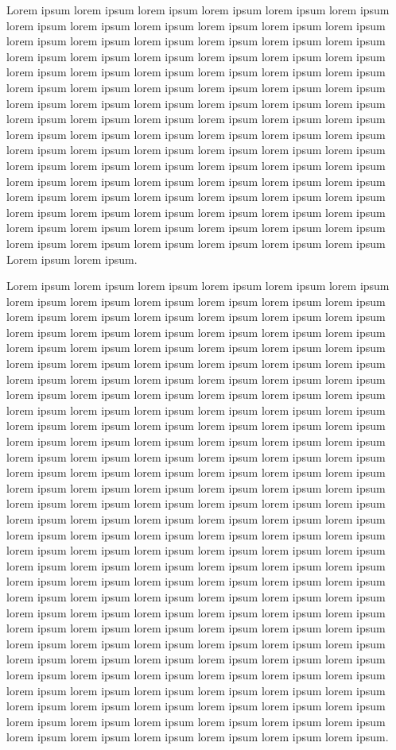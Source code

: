 \documentclass[10pt,twocolumn]{article}
\begin{document}
Lorem ipsum lorem ipsum lorem ipsum lorem ipsum lorem ipsum lorem ipsum lorem
ipsum lorem ipsum lorem ipsum lorem ipsum lorem ipsum lorem ipsum lorem ipsum
lorem ipsum lorem ipsum lorem ipsum lorem ipsum lorem ipsum lorem ipsum lorem
ipsum lorem ipsum lorem ipsum lorem ipsum lorem ipsum lorem ipsum lorem ipsum
lorem ipsum lorem ipsum lorem ipsum lorem ipsum lorem ipsum lorem ipsum lorem
ipsum lorem ipsum lorem ipsum lorem ipsum lorem ipsum lorem ipsum lorem ipsum
lorem ipsum lorem ipsum lorem ipsum lorem ipsum lorem ipsum lorem ipsum lorem
ipsum lorem ipsum lorem ipsum lorem ipsum lorem ipsum lorem ipsum lorem ipsum
lorem ipsum lorem ipsum lorem ipsum lorem ipsum lorem ipsum lorem ipsum lorem
ipsum lorem ipsum lorem ipsum lorem ipsum lorem ipsum lorem ipsum lorem ipsum
lorem ipsum lorem ipsum lorem ipsum lorem ipsum lorem ipsum lorem ipsum lorem
ipsum lorem ipsum lorem ipsum lorem ipsum lorem ipsum lorem ipsum lorem ipsum
lorem ipsum lorem ipsum lorem ipsum lorem ipsum lorem ipsum lorem ipsum lorem
ipsum lorem ipsum lorem ipsum lorem ipsum lorem ipsum lorem ipsum lorem ipsum
lorem ipsum lorem ipsum lorem ipsum lorem ipsum lorem ipsum Lorem ipsum lorem
ipsum.

Lorem ipsum lorem ipsum lorem ipsum lorem ipsum lorem ipsum lorem ipsum lorem
ipsum lorem ipsum lorem ipsum lorem ipsum lorem ipsum lorem ipsum lorem ipsum
lorem ipsum lorem ipsum lorem ipsum lorem ipsum lorem ipsum lorem ipsum lorem
ipsum lorem ipsum lorem ipsum lorem ipsum lorem ipsum lorem ipsum lorem ipsum
lorem ipsum lorem ipsum lorem ipsum lorem ipsum lorem ipsum lorem ipsum lorem
ipsum lorem ipsum lorem ipsum lorem ipsum lorem ipsum lorem ipsum lorem ipsum
lorem ipsum lorem ipsum lorem ipsum lorem ipsum lorem ipsum lorem ipsum lorem
ipsum lorem ipsum lorem ipsum lorem ipsum lorem ipsum lorem ipsum lorem ipsum
lorem ipsum lorem ipsum lorem ipsum lorem ipsum lorem ipsum lorem ipsum lorem
ipsum lorem ipsum lorem ipsum lorem ipsum lorem ipsum lorem ipsum lorem ipsum
lorem ipsum lorem ipsum lorem ipsum lorem ipsum lorem ipsum lorem ipsum lorem
ipsum lorem ipsum lorem ipsum lorem ipsum lorem ipsum lorem ipsum lorem ipsum
lorem ipsum lorem ipsum lorem ipsum lorem ipsum lorem ipsum lorem ipsum lorem
ipsum lorem ipsum lorem ipsum lorem ipsum lorem ipsum lorem ipsum lorem ipsum
lorem ipsum lorem ipsum lorem ipsum lorem ipsum lorem ipsum lorem ipsum lorem
ipsum lorem ipsum lorem ipsum lorem ipsum lorem ipsum lorem ipsum lorem ipsum
lorem ipsum lorem ipsum lorem ipsum lorem ipsum lorem ipsum lorem ipsum lorem
ipsum lorem ipsum lorem ipsum lorem ipsum lorem ipsum lorem ipsum lorem ipsum
lorem ipsum lorem ipsum lorem ipsum lorem ipsum lorem ipsum lorem ipsum lorem
ipsum lorem ipsum lorem ipsum lorem ipsum lorem ipsum lorem ipsum lorem ipsum
lorem ipsum lorem ipsum lorem ipsum lorem ipsum lorem ipsum lorem ipsum lorem
ipsum lorem ipsum lorem ipsum lorem ipsum lorem ipsum lorem ipsum lorem ipsum
lorem ipsum lorem ipsum lorem ipsum lorem ipsum lorem ipsum lorem ipsum lorem
ipsum lorem ipsum lorem ipsum lorem ipsum lorem ipsum lorem ipsum lorem ipsum
lorem ipsum lorem ipsum lorem ipsum lorem ipsum lorem ipsum lorem ipsum lorem
ipsum lorem ipsum lorem ipsum lorem ipsum lorem ipsum lorem ipsum lorem ipsum
lorem ipsum lorem ipsum lorem ipsum lorem ipsum lorem ipsum lorem ipsum lorem
ipsum lorem ipsum lorem ipsum lorem ipsum lorem ipsum.
\end{document}
